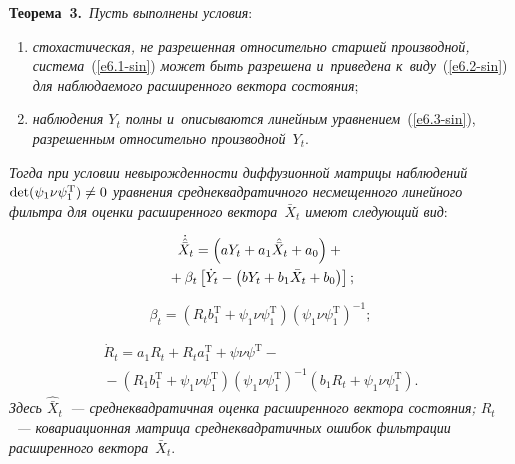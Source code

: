 \begin{multicols}{2}
\smallskip

\noindent
\textbf{Теорема~3.}\ \textit{Пусть выполнены условия}:
\begin{enumerate}[(1)]
\item \textit{стохастическая, не разрешенная относительно старшей производной, сис\-те\-ма}~(\ref{e6.1-sin}) 
\textit{может быть разрешена и~приведена к~виду}~(\ref{e6.2-sin}) 
\textit{для наблюдаемого расширенного вектора состояния};
\item 
\textit{наблюдения  $Y_t$ полны и~описываются линейным уравнением}~(\ref{e6.3-sin}), 
\textit{разрешенным относительно производной~$Y_t$}.
\end{enumerate}
\textit{Тогда при условии невырожденности диффузионной мат\-ри\-цы наблюдений
 $\det (\psi_1\nu\psi_1^{\mathrm{T}})\hm\ne 0$ 
уравнения среднеквадратичного несмещенного линейного фильт\-ра для оценки 
расширенного вектора~$\bar X_t$ имеют сле\-ду\-ющий вид}:

\vspace*{-6pt}

\noindent
\begin{multline}
\dot{\hat{\bar X}}_t = \left(a Y_t + a_1 \hat{\bar X}_t + a_0 \right) +{}\\
{}+ 
    \beta_t \left[ \dot Y_t - \left(bY_t + b_1\bar X_t + b_0\right)\right];
    \label{e6.4-sin}
    \end{multline}
    
    \vspace*{-6pt}
    
    \noindent
\begin{equation}
\beta_t = \left( R_t b_1^{\mathrm{T}} +\psi_1\nu\psi_1^{\mathrm{T}}\right) 
    \left(\psi_1\nu\psi_1^{\mathrm{T}}\right)^{-1};
    \label{e6.5-sin}
    \end{equation}
    
    \vspace*{-12pt}
    
    \noindent
\begin{multline}
\dot R_t = a_1  R_t + R_t a_1^{\mathrm{T}} + \psi\nu\psi^{\mathrm{T}}-{}\\
 \!\!\! \!{}-
  \left( R_1 b_1^{\mathrm{T}} +\psi_1\nu\psi_1^{\mathrm{T}}\right)\!
    \left(\psi_1\nu\psi_1^{\mathrm{T}}\right)^{-1}\! 
    \left(b_1 R_t +\psi_1\nu \psi_1^{\mathrm{T}}\right).\!\!\!
    \label{e6.6-sin}
    \end{multline}
\textit{Здесь $\hat{\bar X}_t $~--- среднеквадратичная оценка расширенного вектора состояния; $R_t$~--- 
ковариационная матрица среднеквадратичных ошибок фильт\-ра\-ции расширенного вектора~$\bar X_t$}.


\end{multicols}
